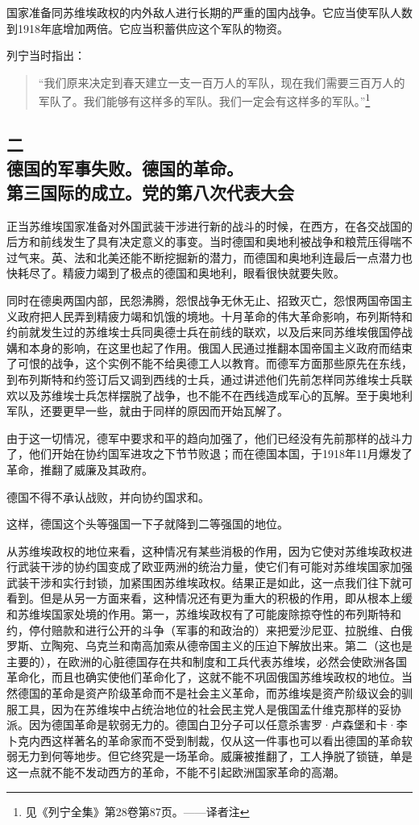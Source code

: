 国家准备同苏维埃政权的内外敌人进行长期的严重的国内战争。它应当使军队人数到1918年底增加两倍。它应当积蓄供应这个军队的物资。

列宁当时指出：

\begin{quotation}
“我们原来决定到春天建立一支一百万人的军队，现在我们需要三百万人的军队了。我们能够有这样多的军队。我们一定会有这样多的军队。”\footnote{见《列宁全集》第28卷第87页。——译者注}
\end{quotation}


\subsection[二\q 德国的军事失败。德国的革命。第三国际的成立。党的第八次代表大会]{二\\德国的军事失败。德国的革命。\\第三国际的成立。党的第八次代表大会}

正当苏维埃国家准备对外国武装干涉进行新的战斗的时候，在西方，在各交战国的后方和前线发生了具有决定意义的事变。当时德国和奥地利被战争和粮荒压得喘不过气来。英、法和北美还能不断挖掘新的潜力，而德国和奥地利连最后一点潜力也快耗尽了。精疲力竭到了极点的德国和奥地利，眼看很快就要失败。

同时在德奥两国内部，民怨沸腾，怨恨战争无休无止、招致灭亡，怨恨两国帝国主义政府把人民弄到精疲力竭和饥饿的境地。十月革命的伟大革命影响，布列斯特和约前就发生过的苏维埃士兵同奥德士兵在前线的联欢，以及后来同苏维埃俄国停战媾和本身的影响，在这里也起了作用。俄国人民通过推翻本国帝国主义政府而结束了可恨的战争，这个实例不能不给奥德工人以教育。而德军方面那些原先在东线，到布列斯特和约签订后又调到西线的士兵，通过讲述他们先前怎样同苏维埃士兵联欢以及苏维埃士兵怎样摆脱了战争，也不能不在西线造成军心的瓦解。至于奥地利军队，还要更早一些，就由于同样的原因而开始瓦解了。

由于这一切情况，德军中要求和平的趋向加强了，他们已经没有先前那样的战斗力了，他们开始在协约国军进攻之下节节败退；而在德国本国，于1918年11月爆发了革命，推翻了威廉及其政府。

德国不得不承认战败，并向协约国求和。

这样，德国这个头等强国一下子就降到二等强国的地位。

从苏维埃政权的地位来看，这种情况有某些消极的作用，因为它使对苏维埃政权进行武装干涉的协约国变成了欧亚两洲的统治力量，使它们有可能对苏维埃国家加强武装干涉和实行封锁，加紧围困苏维埃政权。结果正是如此，这一点我们往下就可看到。但是从另一方面来看，这种情况还有更为重大的积极的作用，即从根本上缓和苏维埃国家处境的作用。第一，苏维埃政权有了可能废除掠夺性的布列斯特和约，停付赔款和进行公开的斗争（军事的和政治的）来把爱沙尼亚、拉脱维、白俄罗斯、立陶宛、乌克兰和南高加索从德帝国主义的压迫下解放出来。第二（这也是主要的），在欧洲的心脏德国存在共和制度和工兵代表苏维埃，必然会使欧洲各国革命化，而且也确实使他们革命化了，这就不能不巩固俄国苏维埃政权的地位。当然德国的革命是资产阶级革命而不是社会主义革命，而苏维埃是资产阶级议会的驯服工具，因为在苏维埃中占统治地位的社会民主党人是俄国孟什维克那样的妥协派。因为德国革命是软弱无力的。德国白卫分子可以任意杀害罗·卢森堡和卡·李卜克内西这样著名的革命家而不受到制裁，仅从这一件事也可以看出德国的革命软弱无力到何等地步。但它终究是一场革命。威廉被推翻了，工人挣脱了锁链，单是这一点就不能不发动西方的革命，不能不引起欧洲国家革命的高潮。

